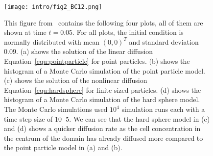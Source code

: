 \begin{figure}[h!]
	\centering
    \texttt{[image: intro/fig2\_BC12.png]}
    \caption{
    This figure from~\cite{Bruna2012} contains the following four plots, all of them are shown at time \( t=0.05 \). 
	For all plots, the initial condition is normally distributed with mean $(0,0)^T$ and standard deviation $0.09$. 
    (a) shows the solution of the linear diffusion Equation~\eqref{equ:pointparticle} for point particles. 
    (b) shows the histogram of a Monte Carlo simulation of the point particle model. 
    (c) shows the solution of the nonlinear diffusion Equation~\eqref{equ:hardsphere} for finite-sized particles. 
    (d) shows the histogram of a Monte Carlo simulation of the hard sphere model. 
    The Monte Carlo simulations used $10^4$ simulation runs each with a time step size of $10^-5$.
	We can see that the hard sphere model in (c) and (d) shows a quicker diffusion rate as the cell concentration in the centrum of the domain has already diffused more compared to the point particle model in (a) and (b). 
    }
    \label{fig:fig2BC12}
\end{figure}



